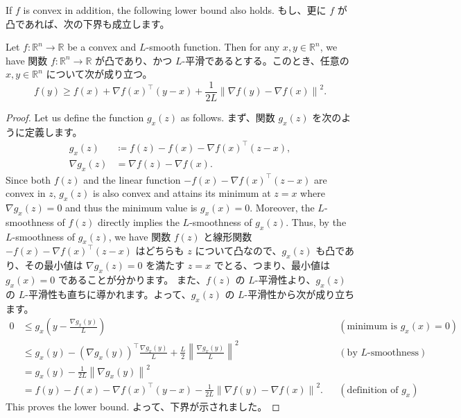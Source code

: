 \documentclass[0_main]{subfiles}
\begin{document}
\ifEn
    If $f$ is convex in addition, the following lower bound also holds.
\else
    もし、更に $f$ が凸であれば、次の下界も成立します\citep[Proposition 2.3.5]{FanZhongXiuMingLianSokZuiShiHuaarugorizumu2023}。
\fi
\begin{proposition}
    \ifEn
        Let $f \colon \mathbb{R}^n \to \mathbb{R}$ be a convex and $L$-smooth function. Then for any $x,y \in \mathbb{R}^n$, we have
    \else
        関数 $f \colon \mathbb{R}^n \to \mathbb{R}$ が凸であり、かつ $L$-平滑であるとする。このとき、任意の $x,y \in \mathbb{R}^n$ について次が成り立つ。
    \fi
    \begin{equation*}
        f(y) \ge f(x) + \nabla f(x)^\top (y-x) + \frac{1}{2L} \left\lVert \nabla f(y) - \nabla f(x) \right\rVert^2.
    \end{equation*}
\end{proposition}
\begin{proof}
    \ifEn
        Let us define the function $g_x(z)$ as follows.
    \else
        まず、関数 $g_x(z)$ を次のように定義します。
    \fi
    \begin{align*}
        g_x(z)        & \coloneqq f(z) - f(x) - \nabla f(x)^\top (z-x), \\
        \nabla g_x(z) & = \nabla f(z) - \nabla f(x).
    \end{align*}
    \ifEn
        Since both $f(z)$ and the linear function $-f(x) - \nabla f(x)^\top (z-x)$ are convex in $z$, $g_x(z)$ is also convex and attains its minimum at $z=x$ where $\nabla g_x(z) = 0$ and thus the minimum value is $g_x(x)=0$.
        Moreover, the $L$-smoothness of $f(z)$ directly implies the $L$-smoothness of $g_x(z)$. Thus, by the $L$-smoothness of $g_x(z)$, we have
    \else
        関数 $f(z)$ と線形関数 $-f(x) - \nabla f(x)^\top (z-x)$ はどちらも $z$ について凸なので、$g_x(z)$ も凸であり、その最小値は $\nabla g_x(z) = 0$ を満たす $z=x$ でとる、つまり、最小値は $g_x(x)=0$ であることが分かります。
        また、$f(z)$ の $L$-平滑性より、$g_x(z)$ の $L$-平滑性も直ちに導かれます。よって、$g_x(z)$ の $L$-平滑性から次が成り立ちます。
    \fi
    \begin{align*}
        0 & \leq g_x\left(y-\frac{\nabla g_x(y)}{L} \right)                                                                             &  & (\text{minimum is $g_x(x)=0$}) \\
          & \leq g_x(y) - (\nabla g_x(y))^\top \frac{\nabla g_x(y)}{L} + \frac{L}{2} \left\lVert \frac{\nabla g_x(y)}{L} \right\rVert^2 &  & (\text{by $L$-smoothness})     \\
          & = g_x(y) - \frac{1}{2L} \left\lVert \nabla g_x(y) \right\rVert^2                                                                                                \\
          & = f(y) - f(x) - \nabla f(x)^\top (y-x) - \frac{1}{2L} \left\lVert \nabla f(y) - \nabla f(x) \right\rVert^2.                 &  & (\text{definition of $g_x$})
    \end{align*}
    \ifEn
        This proves the lower bound.
    \else
        よって、下界が示されました。
    \fi
    \myQED
\end{proof}
\end{document}
